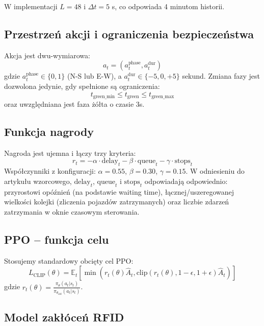 \documentclass[12pt,a4paper]{article}
\begin{document}
W implementacji $L=48$ i $\Delta t=5$ s, co odpowiada 4 minutom historii.

\subsection{Przestrzeń akcji i ograniczenia bezpieczeństwa}

Akcja jest dwu-wymiarowa:
\begin{equation}
a_t = (a_t^{\text{phase}}, a_t^{\text{dur}})
\end{equation}
gdzie $a_t^{\text{phase}} \in \{0,1\}$ (N-S lub E-W), a $a_t^{\text{dur}} \in \{-5, 0, +5\}$ sekund. Zmiana fazy jest dozwolona jedynie, gdy spełnione są ograniczenia:
\begin{equation}
t_{\text{green\_min}} \leq t_{\text{green}} \leq t_{\text{green\_max}}
\end{equation}
oraz uwzględniana jest faza żółta o czasie 3s.

\subsection{Funkcja nagrody}

Nagroda jest ujemna i łączy trzy kryteria:
\begin{equation}
r_t = - \alpha \cdot \text{delay}_t - \beta \cdot \text{queue}_t - \gamma \cdot \text{stops}_t
\end{equation}
Współczynniki z konfiguracji: $\alpha=0.55$, $\beta=0.30$, $\gamma=0.15$.
W odniesieniu do artykułu wzorcowego, $\text{delay}_t$, $\text{queue}_t$ i $\text{stops}_t$ odpowiadają odpowiednio: przyrostowi opóźnień (na podstawie waiting time), łącznej/uszeregowanej wielkości kolejki (zliczenia pojazdów zatrzymanych) oraz liczbie zdarzeń zatrzymania w oknie czasowym sterowania.

\subsection{PPO -- funkcja celu}

Stosujemy standardowy obcięty cel PPO:
\begin{equation}
L_{\text{CLIP}}(\theta) = \mathbb{E}_t \left[\min(r_t(\theta) \hat{A}_t, \text{clip}(r_t(\theta), 1-\epsilon, 1+\epsilon) \hat{A}_t)\right]
\end{equation}
gdzie $r_t(\theta) = \frac{\pi_\theta(a_t|s_t)}{\pi_{\theta_{\text{old}}}(a_t|s_t)}$.

\subsection{Model zakłóceń RFID}
\end{document}
